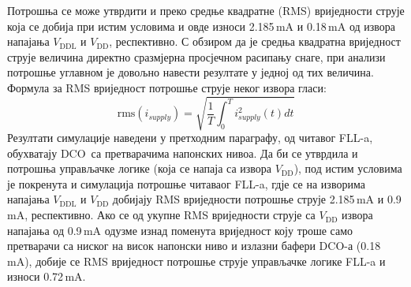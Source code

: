 \documentclass[master]{finthesis}
\def \FLL  {FLL} %
\def \DCO  {DCO} %
\begin{document}
Потрошња се може утврдити и преко средње квадратне (RMS) вриједности струје која се добија при истим условима и овде износи 2.185\,mA и 0.18\,mA од извора напајања $V_\text{DDL}$ и $V_\text{DD}$, респективно. С обзиром да је средња квадратна вриједност струје величина директно сразмјерна просјечном расипању снаге, при анализи потрошње углавном је довољно навести резултате у једној од тих величина. Формула за RMS вриједност потрошње струје неког извора гласи:
\begin{equation}
	\label{eq:impl:dco_pwr:rms_i}
	\text{rms}(i_{supply}) = \sqrt{\frac{1}{T}\int_{0}^{T}i_{supply}^{2}(t)dt}
\end{equation}
Резултати симулације наведени у претходним параграфу, од читавог \FLL-a, обухватају \DCO\ са претварачима напонских нивоа. Да би се утврдила и потрошња управљачке логике (која се напаја са извора $V_\text{DD}$), под истим условима је покренута и симулација потрошње читаваог \FLL-a, гдје се на изворима напајања $V_\text{DDL}$ и $V_\text{DD}$ добијају RMS вриједности потрошње струје 2.185\,mA и 0.9\,mA, респективно. Ако се од укупне RMS вриједности струје са $V_\text{DD}$ извора напајања од 0.9\,mA одузме изнад поменута вриједност коју троше само претварачи са ниског на висок напонски ниво и излазни бафери \DCO-а (0.18\,mA), добије се RMS вриједност потрошње струје управљачке логике \FLL-a и износи 0.72\,mA.
\end{document}
